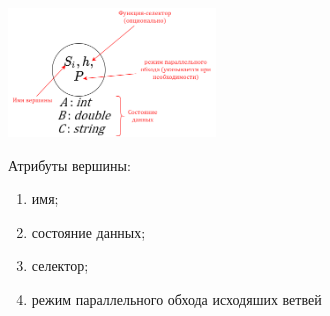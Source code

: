 \begin{frame}
	\begin{figure}
		\begin{minipage}{0.49\textwidth}
			\centering
			\includegraphics[width=0.49\textwidth]{images/illustration.node.png}
		\end{minipage}\hfill\begin{minipage}{0.49\textwidth}
			Атрибуты вершины:
			\begin{enumerate}
				\item имя;
				\item состояние данных;
				\item селектор;
				\item режим параллельного обхода исходяших ветвей
			\end{enumerate}
		\end{minipage}\hfill
	\end{figure}
\end{frame}
